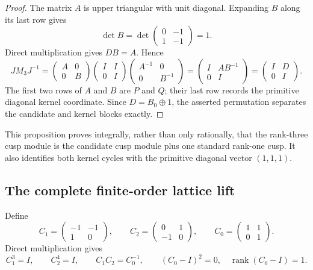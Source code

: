 \begin{proof}
The matrix \(A\) is upper triangular with unit diagonal.  Expanding \(B\)
along its last row gives
\[
 \det B=\det\begin{pmatrix}0&-1\\1&-1\end{pmatrix}=1.
\]
Direct multiplication gives \(DB=A\).  Hence
\[
 JM_3J^{-1}
 =\begin{pmatrix}A&0\\0&B\end{pmatrix}
  \begin{pmatrix}I&I\\0&I\end{pmatrix}
  \begin{pmatrix}A^{-1}&0\\0&B^{-1}\end{pmatrix}
 =\begin{pmatrix}I&AB^{-1}\\0&I\end{pmatrix}
 =\begin{pmatrix}I&D\\0&I\end{pmatrix}.
\]
The first two rows of \(A\) and \(B\) are \(P\) and \(Q\); their last row
records the primitive diagonal kernel coordinate.  Since \(D=B_0\oplus1\),
the asserted permutation separates the candidate and kernel blocks exactly.
\end{proof}

This proposition proves integrally, rather than only rationally, that the
rank-three cusp module is the candidate cusp module plus one standard rank-one
cusp.  It also identifies both kernel cycles with the primitive diagonal
vector \((1,1,1)\).

\subsection{The complete finite-order lattice lift}
\label{subsec:teb-finite-lift}

Define
\[
 C_1=\begin{pmatrix}-1&-1\\1&0\end{pmatrix},
 \qquad
 C_2=\begin{pmatrix}0&1\\-1&0\end{pmatrix},
 \qquad
 C_0=\begin{pmatrix}1&1\\0&1\end{pmatrix}.
 \tag{TEB.41}
\]
Direct multiplication gives
\[
 C_1^3=I,\qquad C_2^4=I,\qquad
 C_1C_2=C_0^{-1},\qquad
 (C_0-I)^2=0,\quad\operatorname{rank}(C_0-I)=1.
 \tag{TEB.42}
\]


